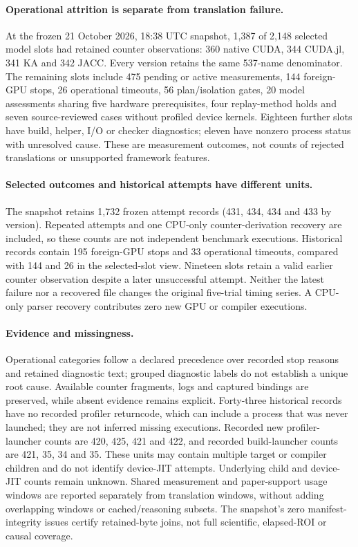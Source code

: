 \paragraph{Operational attrition is separate from translation failure.}
At the frozen 21 October 2026, 18:38 UTC snapshot, 1,387 of 2,148 selected model slots had retained counter observations: 360 native CUDA, 344 CUDA.jl, 341 KA and 342 JACC. Every version retains the same 537-name denominator. The remaining slots include 475 pending or active measurements, 144 foreign-GPU stops, 26 operational timeouts, 56 plan/isolation gates, 20 model assessments sharing five hardware prerequisites, four replay-method holds and seven source-reviewed cases without profiled device kernels. Eighteen further slots have build, helper, I/O or checker diagnostics; eleven have nonzero process status with unresolved cause. These are measurement outcomes, not counts of rejected translations or unsupported framework features.

\paragraph{Selected outcomes and historical attempts have different units.}
The snapshot retains 1,732 frozen attempt records (431, 434, 434 and 433 by version). Repeated attempts and one CPU-only counter-derivation recovery are included, so these counts are not independent benchmark executions. Historical records contain 195 foreign-GPU stops and 33 operational timeouts, compared with 144 and 26 in the selected-slot view. Nineteen slots retain a valid earlier counter observation despite a later unsuccessful attempt. Neither the latest failure nor a recovered file changes the original five-trial timing series. A CPU-only parser recovery contributes zero new GPU or compiler executions.

\paragraph{Evidence and missingness.}
Operational categories follow a declared precedence over recorded stop reasons and retained diagnostic text; grouped diagnostic labels do not establish a unique root cause. Available counter fragments, logs and captured bindings are preserved, while absent evidence remains explicit. Forty-three historical records have no recorded profiler returncode, which can include a process that was never launched; they are not inferred missing executions. Recorded new profiler-launcher counts are 420, 425, 421 and 422, and recorded build-launcher counts are 421, 35, 34 and 35. These units may contain multiple target or compiler children and do not identify device-JIT attempts. Underlying child and device-JIT counts remain unknown. Shared measurement and paper-support usage windows are reported separately from translation windows, without adding overlapping windows or cached/reasoning subsets. The snapshot's zero manifest-integrity issues certify retained-byte joins, not full scientific, elapsed-ROI or causal coverage.
